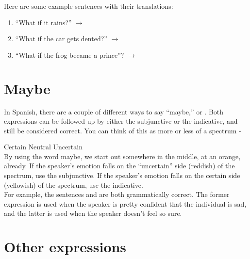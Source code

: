 Here are some example sentences with their translations:

\begin{enumerate}[noitemsep]
	\item ``What if it rains?'' $\rightarrow$ 
	\item ``What if the car gets dented?'' $\rightarrow$ 
	\item ``What if the frog became a prince''? $\rightarrow$ 
\end{enumerate}


\section{Maybe}

In Spanish, there are a couple of different ways to say ``maybe,''  or . Both expressions can be followed up by either the subjunctive or the indicative, and still be considered correct. You can think of this as more or less of a spectrum -


\begin{center}
\end{center}
Certain \hfill Neutral \hfill Uncertain\\ 
 
By using the word maybe, we start out somewhere in the middle, at an orange, already. If the speaker's emotion falls on the ``uncertain'' side (reddish) of the spectrum, use the subjunctive. If the speaker's emotion falls on the certain side (yellowish) of the spectrum, use the indicative. \\

For example, the sentences  and  are both grammatically correct. The former expression is used when the speaker is pretty confident that the individual is sad, and the latter is used when the speaker doesn't feel so sure.

\section{Other expressions}

